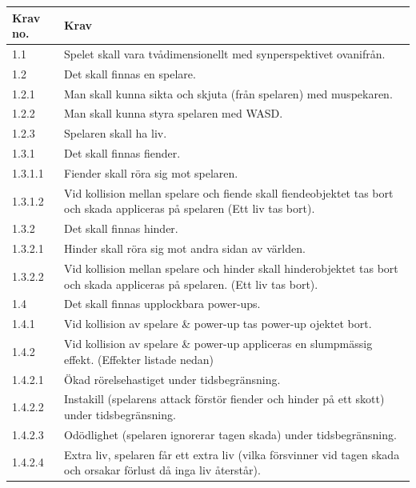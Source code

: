 \documentclass{TDP005mall}
\begin{document}
\begin{table}[!h]
\begin{tabularx}{\linewidth}{|l|X|}
\hline
Krav no. & Krav \\\hline

1.1 &  Spelet skall vara tvådimensionellt med synperspektivet ovanifrån.\\\hline

1.2 &  Det skall finnas en spelare.\\\hline

1.2.1 &  Man skall kunna sikta och skjuta (från spelaren) med muspekaren.\\\hline

1.2.2 &  Man skall kunna styra spelaren med WASD.\\\hline

1.2.3 &  Spelaren skall ha liv.\\\hline

1.3.1 &  Det skall finnas fiender.\\\hline

1.3.1.1 &  Fiender skall röra sig mot spelaren.\\\hline

1.3.1.2 &  Vid kollision mellan spelare och fiende skall fiendeobjektet tas bort och skada appliceras på spelaren (Ett liv tas bort).\\\hline

1.3.2 &  Det skall finnas hinder.\\\hline

1.3.2.1 &  Hinder skall röra sig mot andra sidan av världen.\\\hline

1.3.2.2 &  Vid kollision mellan spelare och hinder skall hinderobjektet tas bort och skada appliceras på spelaren. (Ett liv tas bort).\\\hline

1.4 &  Det skall finnas upplockbara power-ups.\\\hline

1.4.1 &  Vid kollision av spelare \& power-up tas power-up ojektet bort.\\\hline

1.4.2 &  Vid kollision av spelare \& power-up appliceras en slumpmässig effekt. (Effekter listade nedan)\\\hline

1.4.2.1 &  Ökad rörelsehastiget under tidsbegränsning.\\\hline
1.4.2.2 &  Instakill (spelarens attack förstör fiender och hinder på ett skott) under tidsbegränsning.\\\hline
1.4.2.3 &  Odödlighet (spelaren ignorerar tagen skada) under tidsbegränsning.\\\hline
1.4.2.4 &  Extra liv, spelaren får ett extra liv (vilka försvinner vid tagen skada och orsakar förlust då inga liv återstår).\\\hline


\end{tabularx}
\end{table}
\end{document}
